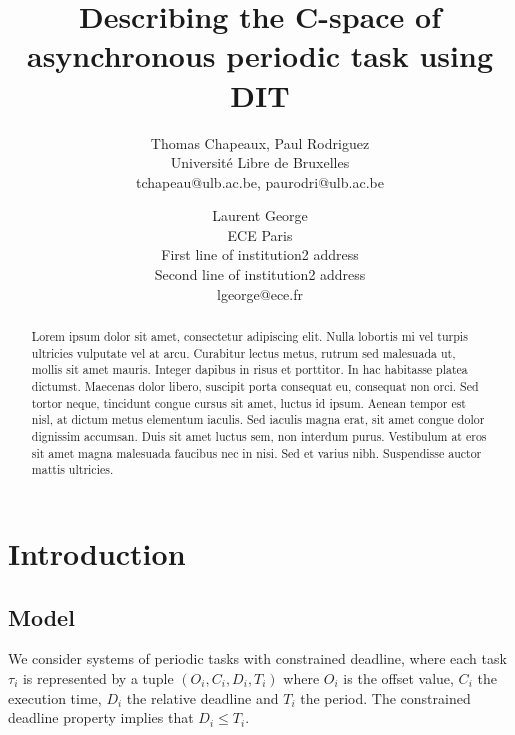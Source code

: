 \documentclass[times, 10pt,twocolumn, a4paper]{article}
\begin{document}
\title{Describing the C-space of asynchronous periodic task using DIT}

\author{Thomas Chapeaux, Paul Rodriguez\\
Universit\'e Libre de Bruxelles\\ tchapeau@ulb.ac.be, paurodri@ulb.ac.be \\
\and
Laurent George\\
ECE Paris\\
First line of institution2 address\\ Second line of institution2 address\\
lgeorge@ece.fr\\
}

\maketitle
\thispagestyle{empty}

\begin{abstract}
   Lorem ipsum dolor sit amet, consectetur adipiscing elit. Nulla lobortis mi vel turpis ultricies vulputate vel at arcu. Curabitur lectus metus, rutrum sed malesuada ut, mollis sit amet mauris. Integer dapibus in risus et porttitor. In hac habitasse platea dictumst. Maecenas dolor libero, suscipit porta consequat eu, consequat non orci. Sed tortor neque, tincidunt congue cursus sit amet, luctus id ipsum. Aenean tempor est nisl, at dictum metus elementum iaculis. Sed iaculis magna erat, sit amet congue dolor dignissim accumsan. Duis sit amet luctus sem, non interdum purus. Vestibulum at eros sit amet magna malesuada faucibus nec in nisi. Sed et varius nibh. Suspendisse auctor mattis ultricies.
\end{abstract}


\section{Introduction}

  \subsection{Model}

  We consider systems of periodic tasks with constrained deadline, where each task $\tau_i$ is represented by a tuple $(O_i, C_i, D_i, T_i)$ where $O_i$ is the offset value, $C_i$ the execution time, $D_i$ the relative deadline and $T_i$ the period. The constrained deadline property implies that $D_i \leq T_i$.\\
\end{document}

